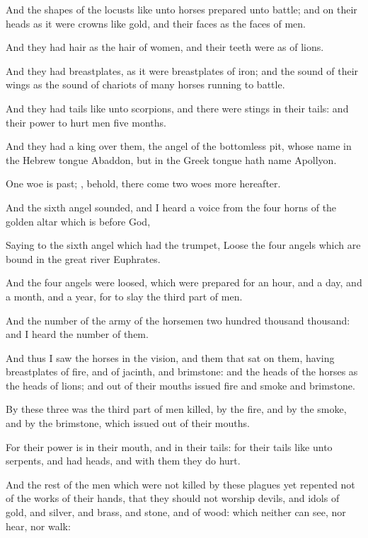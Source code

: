 {And the
shapes of the
locusts
{} like
unto
horses
prepared
unto
battle;
and
on
their
heads
{} as it
were
crowns
like
gold,
and
their
faces
{}
as the
faces of
men.

And they
had
hair
as the
hair of
women,
and
their
teeth
were
as
{} of
lions.

And they
had
breastplates, as it
were
breastplates of
iron;
and the
sound of
their
wings
{}
as the
sound of
chariots of
many
horses
running
to
battle.

And they
had
tails like
unto
scorpions,
and there
were
stings
in
their
tails:
and
their
power
{} to
hurt
men
five
months.

And they
had a
king
over
them,
{} the
angel of the bottomless
pit, whose
name in the Hebrew
tongue
{}
Abaddon,
but
in the Greek
tongue
hath
{}
name
Apollyon.

One
woe is
past;
{},
behold, there
come
two
woes
more
hereafter.


\par }{\PP {}And the
sixth
angel
sounded,
and I
heard
a
voice
from the
four
horns of the
golden
altar which is
before
God,

Saying to the
sixth
angel
which
had the
trumpet,
Loose the
four
angels
which are
bound
in the
great
river
Euphrates.

And the
four
angels were
loosed,
which were
prepared
for an
hour,
and a
day,
and a
month,
and a
year, for
to
slay the third
part of
men.

And the
number of the
army of the
horsemen
{}
two hundred
thousand
thousand:
and I
heard the
number of
them.

And
thus I
saw the
horses
in the
vision,
and
them that
sat
on
them,
having
breastplates of
fire,
and of
jacinth,
and
brimstone:
and the
heads of the
horses
{}
as the
heads of
lions;
and
out of
their
mouths
issued
fire
and
smoke
and
brimstone.

By
these
three was the third
part of
men
killed,
by the
fire,
and
by the
smoke,
and
by the
brimstone,
which
issued
out of
their
mouths.

For
their
power
is
in
their
mouth,
and
in
their
tails:
for
their
tails
{} like
unto
serpents, and
had
heads,
and
with
them they do
hurt.

And the
rest of the
men
which
were
not
killed
by
these
plagues yet
repented
not
of the
works of
their
hands,
that they
should
not
worship
devils,
and
idols of
gold,
and
silver,
and
brass,
and
stone,
and of
wood:
which
neither
can
see,
nor
hear,
nor
walk:

}
